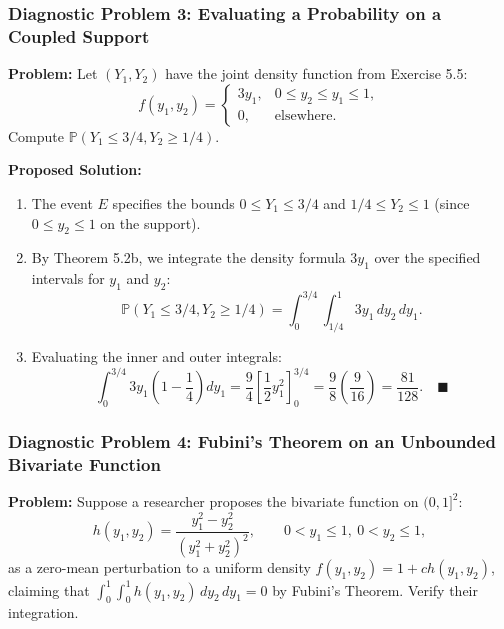 \documentclass[11pt, letterpaper]{article}
\theoremstyle{definition}
\theoremstyle{remark}
\begin{document}
\bigskip

\subsubsection*{Diagnostic Problem 3: Evaluating a Probability on a Coupled Support}
\textbf{Problem:} Let $(Y_1, Y_2)$ have the joint density function from Exercise 5.5:
\[
    f(y_1, y_2) = \begin{cases}
        3y_1, & 0 \le y_2 \le y_1 \le 1, \\
        0, & \text{elsewhere.}
    \end{cases}
\]
Compute $\mathbb{P}(Y_1 \le 3/4, Y_2 \ge 1/4)$.

\textbf{Proposed Solution:}
\begin{enumerate}[label=\textbf{Step \arabic*:}]
    \item The event $E$ specifies the bounds $0 \le Y_1 \le 3/4$ and $1/4 \le Y_2 \le 1$ (since $0 \le y_2 \le 1$ on the support).
    \item By Theorem 5.2b, we integrate the density formula $3y_1$ over the specified intervals for $y_1$ and $y_2$:
    \[
        \mathbb{P}(Y_1 \le 3/4, Y_2 \ge 1/4) = \int_{0}^{3/4} \int_{1/4}^{1} 3y_1 \, dy_2 \, dy_1.
    \]
    \item Evaluating the inner and outer integrals:
    \[
        \int_{0}^{3/4} 3y_1 \left(1 - \frac{1}{4}\right) dy_1 = \frac{9}{4} \left[ \frac{1}{2} y_1^2 \right]_{0}^{3/4} = \frac{9}{8} \left(\frac{9}{16}\right) = \frac{81}{128}. \quad \blacksquare
    \]
\end{enumerate}

\bigskip

\subsubsection*{Diagnostic Problem 4: Fubini's Theorem on an Unbounded Bivariate Function}
\textbf{Problem:} Suppose a researcher proposes the bivariate function on $(0, 1]^2$:
\[
    h(y_1, y_2) = \frac{y_1^2 - y_2^2}{(y_1^2 + y_2^2)^2}, \qquad 0 < y_1 \le 1,\ 0 < y_2 \le 1,
\]
as a zero-mean perturbation to a uniform density $f(y_1, y_2) = 1 + c h(y_1, y_2)$, claiming that $\int_0^1 \int_0^1 h(y_1, y_2)\,dy_2\,dy_1 = 0$ by Fubini's Theorem. Verify their integration.
\end{document}
